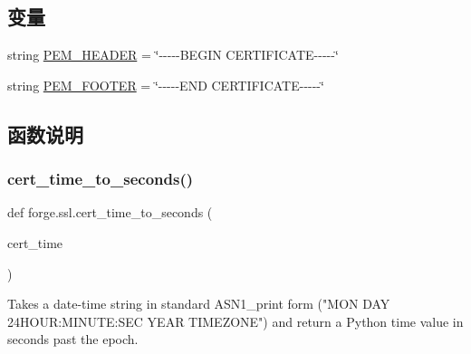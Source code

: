 \subsection*{变量}
\begin{DoxyCompactItemize}
\item 
string \mbox{\hyperlink{namespaceforge_1_1ssl_a99dffc73bf2c64e8d1c46dac181f8ddf}{P\+E\+M\+\_\+\+H\+E\+A\+D\+ER}} = \char`\"{}-\/-\/-\/-\/-\/B\+E\+G\+IN C\+E\+R\+T\+I\+F\+I\+C\+A\+TE-\/-\/-\/-\/-\/\char`\"{}
\item 
string \mbox{\hyperlink{namespaceforge_1_1ssl_a5ead7d8786c1664f8868104113740ba9}{P\+E\+M\+\_\+\+F\+O\+O\+T\+ER}} = \char`\"{}-\/-\/-\/-\/-\/E\+ND C\+E\+R\+T\+I\+F\+I\+C\+A\+TE-\/-\/-\/-\/-\/\char`\"{}
\end{DoxyCompactItemize}


\subsection{函数说明}
\mbox{\label{namespaceforge_1_1ssl_ab72480f870ee3cb1c911d2d19a090908}} 
\subsubsection{\texorpdfstring{cert\+\_\+time\+\_\+to\+\_\+seconds()}{cert\_time\_to\_seconds()}}
{\footnotesize\ttfamily def forge.\+ssl.\+cert\+\_\+time\+\_\+to\+\_\+seconds (\begin{DoxyParamCaption}\item[{}]{cert\+\_\+time }\end{DoxyParamCaption})}

\begin{DoxyVerb}Takes a date-time string in standard ASN1_print form
("MON DAY 24HOUR:MINUTE:SEC YEAR TIMEZONE") and return
a Python time value in seconds past the epoch.\end{DoxyVerb}
 \mbox{\label{namespaceforge_1_1ssl_a55a2fe3d19271215dcab8f55dc6ac946}} 
